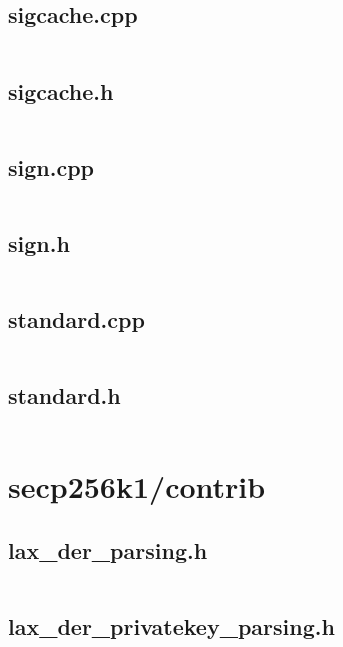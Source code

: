 \documentclass{article}
\begin{document}
\subsection{sigcache.cpp}
\inputminted{cpp}{/home/dufferzafar/dev/@clones/bitcoin/src/script/sigcache.cpp}
\newpage

\subsection{sigcache.h}
\inputminted{cpp}{/home/dufferzafar/dev/@clones/bitcoin/src/script/sigcache.h}
\newpage

\subsection{sign.cpp}
\inputminted{cpp}{/home/dufferzafar/dev/@clones/bitcoin/src/script/sign.cpp}
\newpage

\subsection{sign.h}
\inputminted{cpp}{/home/dufferzafar/dev/@clones/bitcoin/src/script/sign.h}
\newpage

\subsection{standard.cpp}
\inputminted{cpp}{/home/dufferzafar/dev/@clones/bitcoin/src/script/standard.cpp}
\newpage

\subsection{standard.h}
\inputminted{cpp}{/home/dufferzafar/dev/@clones/bitcoin/src/script/standard.h}
\newpage

\section{secp256k1/contrib}

\subsection{lax\_der\_parsing.h}
\inputminted{cpp}{/home/dufferzafar/dev/@clones/bitcoin/src/secp256k1/contrib/lax_der_parsing.h}
\newpage

\subsection{lax\_der\_privatekey\_parsing.h}
\inputminted{cpp}{/home/dufferzafar/dev/@clones/bitcoin/src/secp256k1/contrib/lax_der_privatekey_parsing.h}
\newpage
\end{document}
